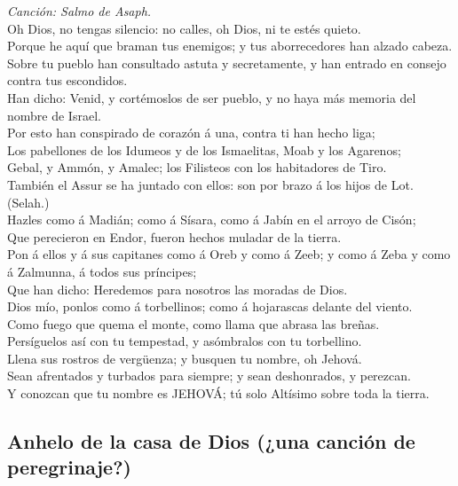  \emph{Canción: Salmo de Asaph.}\\
Oh Dios, no tengas silencio: no calles, oh Dios, ni te estés quieto.\\
 Porque he aquí que braman tus enemigos; y tus aborrecedores
han alzado cabeza.\\
 Sobre tu pueblo han consultado astuta y secretamente, y han
entrado en consejo contra tus escondidos.\\
 Han dicho: Venid, y cortémoslos de ser pueblo, y no haya
más memoria del nombre de Israel.\\
 Por esto han conspirado de corazón á una, contra ti han
hecho liga;\\
 Los pabellones de los Idumeos y de los Ismaelitas, Moab y
los Agarenos;\\
 Gebal, y Ammón, y Amalec; los Filisteos con los habitadores
de Tiro.\\
 También el Assur se ha juntado con ellos: son por brazo á
los hijos de Lot. (Selah.)\\
 Hazles como á Madián; como á Sísara, como á Jabín en el
arroyo de Cisón;\\
 Que perecieron en Endor, fueron hechos muladar de la
tierra.\\
 Pon á ellos y á sus capitanes como á Oreb y como á Zeeb; y
como á Zeba y como á Zalmunna, á todos sus príncipes;\\
 Que han dicho: Heredemos para nosotros las moradas de
Dios.\\
 Dios mío, ponlos como á torbellinos; como á hojarascas
delante del viento.\\
 Como fuego que quema el monte, como llama que abrasa las
breñas.\\
 Persíguelos así con tu tempestad, y asómbralos con tu
torbellino.\\
 Llena sus rostros de vergüenza; y busquen tu nombre, oh
Jehová.\\
 Sean afrentados y turbados para siempre; y sean
deshonrados, y perezcan.\\
 Y conozcan que tu nombre es JEHOVÁ; tú solo Altísimo sobre
toda la tierra.

\hypertarget{anhelo-de-la-casa-de-dios-una-canciuxf3n-de-peregrinaje}{%
\subsection{Anhelo de la casa de Dios (¿una canción de
peregrinaje?)}\label{anhelo-de-la-casa-de-dios-una-canciuxf3n-de-peregrinaje}}

